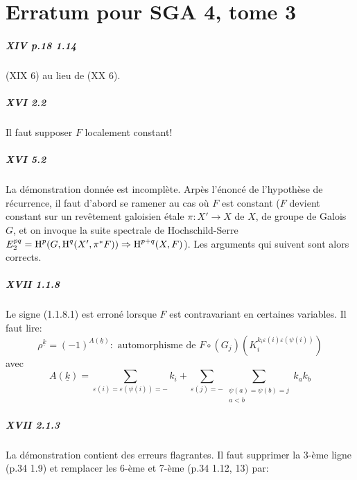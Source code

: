 
\appendix
\chapter{Erratum pour SGA 4, tome 3}

\paragraph*{XIV p.18 1.14}
(XIX 6) au lieu de (XX 6). 

\paragraph*{XVI 2.2}
Il faut supposer $F$ localement constant!

\paragraph*{XVI 5.2}
La démonstration donnée est incomplète. Arpès l'énoncé de 
l'hypothèse de récurrence, il faut d'abord se ramener au cas o\`u $F$ est 
constant ($F$ devient constant sur un rev\^etement galoisien étale 
$\pi:X'\to X$ de $X$, de groupe de Galois $G$, et on invoque la suite spectrale 
de Hochschild-Serre $E_2^{p q}=\operatorname{H}^p(G,\operatorname{H}^q(X',\pi^\ast F))\Rightarrow \operatorname{H}^{p+q}(X,F)$). 
Les arguments qui suivent sont alors corrects. 

\paragraph*{XVII 1.1.8}
Le signe (1.1.8.1) est erroné lorsque $F$ est contravariant en certaines 
variables. Il faut lire: 
\begin{equation*}\tag{1.1.8.1}
  \rho^{\underline k} = (-1)^{A(\underline k)}: \text{ automorphisme de }
F\circ (G_j)\left(K_i^{k_i\varepsilon(i)\varepsilon(\psi(i))}\right) 
\end{equation*}
avec 
\[
  A(\underline k) = \sum_{\varepsilon(i) = \varepsilon(\psi(i))=-} k_i + \sum_{\varepsilon(j)=-} \sum_{\substack{\psi(a)=\psi(b)=j \\ a<b}} k_a k_b 
\]

\paragraph*{XVII 2.1.3}
La démonstration contient des erreurs flagrantes. Il faut supprimer la 
3-ème ligne (p.34 1.9) et remplacer les 6-ème et 7-ème (p.34 1.12, 13) 
par: 

